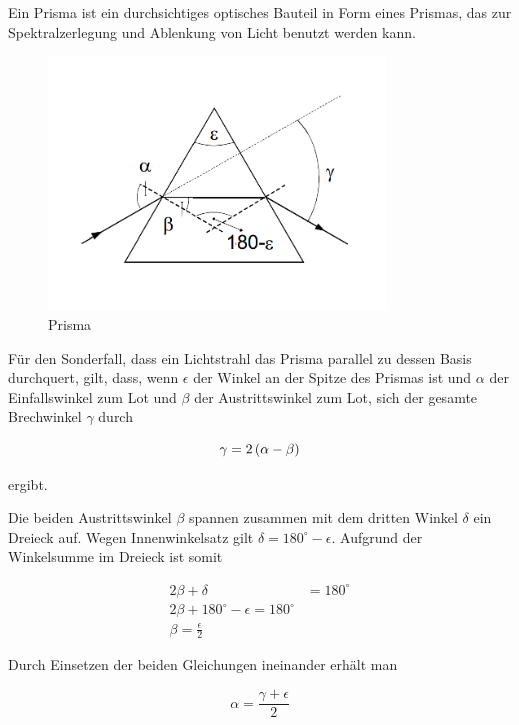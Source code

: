 \documentclass[a4paper,german,12pt,smallheadings]{scrartcl}
\begin{document}
Ein Prisma ist ein durchsichtiges optisches Bauteil in Form eines Prismas, das
zur Spektralzerlegung und Ablenkung von Licht benutzt werden kann.

\begin{figure}[h!]
    \centering
    \includegraphics[width=0.8\textwidth]{prisma.png}
    \caption{Prisma}
    \label{fig:prisma}
\end{figure}

Für den Sonderfall, dass ein Lichtstrahl das Prisma parallel zu dessen Basis
durchquert, gilt, dass, wenn $\epsilon$ der Winkel an der Spitze des Prismas ist und
$\alpha$ der Einfallswinkel zum Lot und $\beta$ der Austrittswinkel zum Lot,
sich der gesamte Brechwinkel $\gamma$ durch

\begin{equation}
  \gamma = 2 \del{\alpha - \beta}
\end{equation}

ergibt.

Die beiden Austrittswinkel $\beta$ spannen zusammen mit dem dritten Winkel
$\delta$ ein Dreieck auf. Wegen Innenwinkelsatz gilt $\delta = 180^\circ -
\epsilon$. Aufgrund der Winkelsumme im Dreieck ist somit

\begin{align*}
  2 \beta + \delta &= 180^\circ \\
  2 \beta + 180^\circ - \epsilon = 180^\circ \\
  \beta = \frac{\epsilon}{2}
\end{align*}

Durch Einsetzen der beiden Gleichungen ineinander erhält man

\begin{equation}
  \alpha = \frac{\gamma + \epsilon}{2}
\end{equation}
\end{document}
